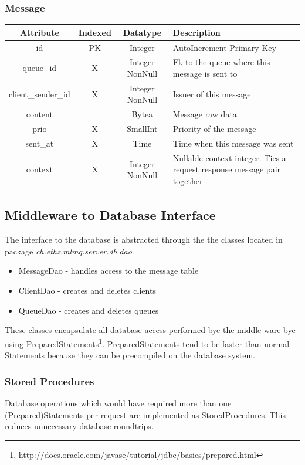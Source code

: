 \documentclass[a4paper]{article}
\begin{document}
\subsubsection{Message}
\begin{tabular}{|c|c|c|l|}
\hline 
\textbf{Attribute} & \textbf{Indexed} & \textbf{Datatype} & \textbf{Description} \\ 
\hline 
id & PK & Integer & AutoIncrement Primary Key \\ 
\hline 
queue\_id & X & Integer NonNull & Fk to the queue where this message is sent to\\ 
\hline 
client\_sender\_id & X & Integer NonNull & Issuer of this message \\ 
\hline 
content &  & Bytea & Message raw data \\ 
\hline 
prio & X & SmallInt & Priority of the message \\ 
\hline 
sent\_at & X & Time & Time when this message was sent \\ 
\hline 
context & X & Integer NonNull & Nullable context integer. Ties a request response message pair together \\ 
\hline 
\end{tabular} 



\subsection{Middleware to Database Interface}

The interface to the database is abstracted through the the classes located in package \textit{ch.ethz.mlmq.server.db.dao}.

\begin{itemize}
\item MessageDao - handles access to the message table
\item ClientDao - creates and deletes clients
\item QueueDao - creates and deletes queues
\end{itemize}

These classes encapsulate all database access performed bye the middle ware bye using PreparedStatements\footnote{\url{http://docs.oracle.com/javase/tutorial/jdbc/basics/prepared.html}}. PreparedStatements tend to be faster than normal Statements because they can be precompiled on the database system.

\subsubsection{Stored Procedures}
Database operations which would have required more than one (Prepared)Statements per request are implemented as StoredProcedures. This reduces unnecessary database roundtrips.
\end{document}
